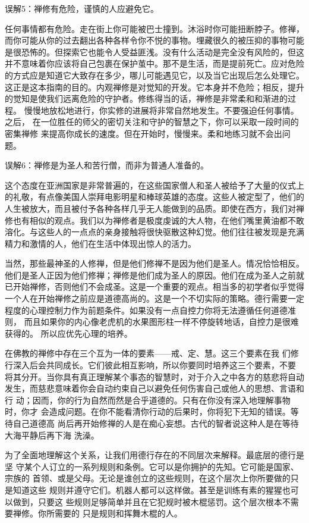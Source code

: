 \subsectnon 误解5：禅修有危险，谨慎的人应避免它。

任何事情都有危险。走在街上你可能被巴士撞到。沐浴时你可能扭断脖子。修禅，
而你可能从你的过去翻出各种各样令你不悦的事物。埋藏很久的被压抑的事物可能
是很恐怖的。但探索它也能令人受益匪浅。没有什么活动是完全没有风险的，但这
并不意味着你应该将自己包裹在保护茧中。那不是生活，而是提前死亡。应对危险
的方式应是知道它大致存在多少，哪儿可能遇见它，以及当它出现后\1怎么处理它。
这正是这本指南的目的。内观禅修是对觉知的开发。它本身并不危险；相反，提升
的觉知是使我们远离危险的守护者。修练得当的话，禅修是非常柔和和渐进的过程。
慢慢地放松地进行，你实修的进展将非常自然地发生。不要强迫任何事情。之后，
在一位胜任的师父的密切关注和守护的智慧之下，你可以采取一段时间的密集禅修
来提高你成长的速度。但在开始时，慢慢来。柔和地练习就不会出问题。

\subsectnon 误解6：禅修是为圣人和苦行僧，而非为普通人准备的。

这个态度在亚洲国家是非常普遍的，在这些国家僧人和圣人被给予了大量的仪式上
的礼敬，有点像美国人崇拜电影明星和棒球英雄的态度。这些人被定型了，他们的
人生被放大，而且被付予各种各样几乎无人能做到的品质。即使在西方，我们对禅
修也有相似的观点。我们以为禅修者是极度虔诚的大人物，在他们嘴里黄油都不敢
溶化。与这些人的一点点的亲身接触将很快驱散这种幻觉。他们往往被发现是充满
精力和激情的人，他们在生活中体现出惊人的活力。

当然，那些最神圣的人修禅，但是他们修禅不是因为他们是圣人。情况恰恰相反。
他们是圣人正因为他们修禅；禅修是他们成为圣人的原因。他们在成为圣人之前就
已开始禅修，否则他们不会成圣。这是一个重要的观点。相当多的初学者似乎觉得
一个人\1在开始禅修之前应是道德高尚的。这是一个不切实际的策略。德行需要一定
程度的心理控制力作为前题条件。如果没有一点自控力你将无法遵循任何道德准则，
而且如果你的内心像老虎机的水果图形柱一样不停旋转地话，自控力是很难获得的。
所以应优先心理的培养。

在佛教的禅修中存在三个互为一体的要素——戒、定、慧。这三个要素在我
们修行深入后会共同成长。它们彼此相互影响，所以你要同时培养这三个要素，不要
将其分开。当你具有真正理解某个事态的智慧时，对于介入之中各方的慈悲将自动
发生，而慈悲意味着你会自动约束自己以避免任何伤害自己或他人的思想、言语和行
动；因而，你的行为自然而然是合乎道德的。只有在你没有深入地理解事物时，你才
会造成问题。在你不能看清你行动的后果时，你将犯下无知的错误。等待自己道德高
尚后再开始修禅的人是在痴心妄想。古代的智者说这种人是在等待大海平静后再下海
洗澡。

为了全面地理解这个关系，让我们用德行存在的不同层次来解释。最底层的德行是坚
守某个人订立的一系列规则和条例。它可以是你拥护的先知。它可能是国家、宗族的
首领、或是父母。无论是谁创立的这些规则，在这个层次上你所要做的只是知道这些
规则并遵守它们。机器人都可以这样做。甚至是训练有素的猩猩也可以做到，只要这
些规则足够简单并且在它犯规时被木棍惩罚。这个层次根本不需要禅修。你所需要的
只是规则和挥舞木棍的人。


